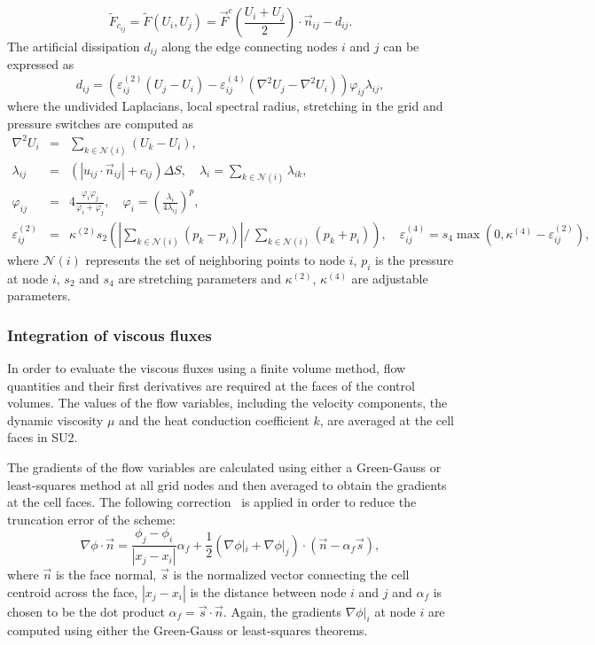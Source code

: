 \begin{equation}
 \tilde{F}_{c_{ij}} = \tilde{F}(U_i, U_j) = \vec F^c \left( \frac{U_i +U_j}{2} \right) \cdot \vec n_{ij}  - d_{ij}.
\label{eq:JST}
\end{equation}
The artificial dissipation $d_{ij}$ along the edge connecting nodes $i$ and $j$ can be expressed as
\begin{equation}
d_{ij} =\left( \varepsilon_{ij}^{(2)}(U_j-U_i) - \varepsilon_{ij}^{(4)} (\nabla^2 U_j - \nabla^2 U_i) \right) \varphi_{ij} \lambda_{ij}, 
\end{equation}
where the undivided Laplacians, local spectral radius, stretching in the grid and pressure switches are computed as 
\begin{eqnarray}
\nabla^2 U_i &=& \sum_{k \in \mathcal{N}(i)}(U_k-U_i), \\
\lambda_{ij} &=& (|u_{ij} \cdot \vec n_{ij}| + c_{ij}) \Delta S, \quad \lambda_{i} = \sum_{k \in \mathcal{N}(i)} \lambda_{ik},\\
\varphi_{ij} &=& 4 \frac{\varphi_i \varphi_j}{\varphi_i + \varphi_j}, \quad \varphi_i = \left( \frac{\lambda_i}{4 \lambda_{ij}} \right)^p, \\
\varepsilon_{ij}^{(2)} &=& \kappa^{(2)} s_2 \left(  \left| \sum_{k \in \mathcal{N}(i)} (p_k-p_i) \right| / \ \sum_{k \in \mathcal{N}(i)} (p_k+p_i) \right), \quad \varepsilon_{ij}^{(4)} = s_4 \max \left(0,\kappa^{(4)}-\varepsilon_{ij}^{(2)}\right),
\end{eqnarray}
where $\mathcal{N}(i)$ represents the set of neighboring points to node $i$,  $p_i$ is the pressure at node $i$, $s_2$ and $s_4$ are stretching parameters and $\kappa^{(2)}$, $\kappa^{(4)}$ are adjustable parameters.

\subsubsection{Integration of viscous fluxes}

In order to evaluate the viscous fluxes using a finite volume method, flow quantities and their first derivatives are required at the faces of the control volumes. The values of the flow variables, including the velocity components, the dynamic viscosity $\mu$ and the heat conduction coefficient $k$, are averaged at the cell faces in SU2. 

The gradients of the flow variables are calculated using either a Green-Gauss or least-squares method at all grid nodes and then averaged to obtain the gradients at the cell faces. The following correction~\cite{weiss1997} is applied in order to reduce the truncation error of the scheme:
\begin{equation}
\nabla \phi \cdot \vec n = \frac{\phi_{j}-\phi_i}{|x_{j}-x_i|}\alpha_f + \frac{1}{2}(\nabla \phi|_i + \nabla \phi|_j)\cdot(\vec n-\alpha_f \vec s),
\end{equation}
where $\vec {n}$ is the face normal, $\vec s$ is the normalized vector connecting the cell centroid across the face, $|x_{j}-x_i|$ is the distance between node $i$ and $j$ and $\alpha _f$ is chosen to be the dot product $\alpha_f = \vec s\cdot \vec {n}$. Again, the gradients $\nabla \phi|_i$ at node $i$ are computed using either the Green-Gauss or least-squares theorems.

